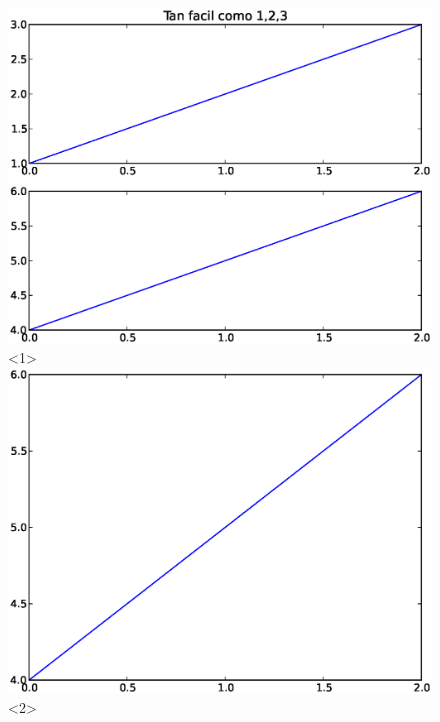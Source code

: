 \begin{frame}[fragile]
\begin{figure}
	\centering
	\includegraphics[scale=0.5]{Imagenes/plotEjercicio5_1.eps}<1>
	\includegraphics[scale=0.5]{Imagenes/plotEjercicio5_2.eps}<2>
\end{figure}
\end{frame}
